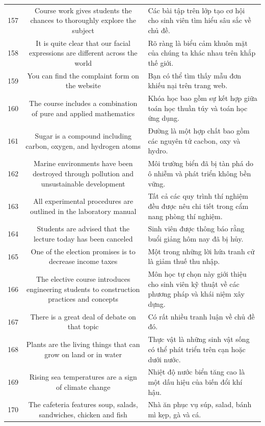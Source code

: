 \documentclass[11pt,a4paper]{article}
\begin{document}
\begin{longtable}{N S M}
157 & Course work gives students the chances to thoroughly explore the subject & Các bài tập trên lớp tạo cơ hội cho sinh viên tìm hiểu sâu sắc về chủ đề. \\
158 & It is quite clear that our facial expressions are different across the world & Rõ ràng là biểu cảm khuôn mặt của chúng ta khác nhau trên khắp thế giới. \\
159 & You can find the complaint form on the website & Bạn có thể tìm thấy mẫu đơn khiếu nại trên trang web. \\
160 & The course includes a combination of pure and applied mathematics & Khóa học bao gồm sự kết hợp giữa toán học thuần túy và toán học ứng dụng. \\
161 & Sugar is a compound including carbon, oxygen, and hydrogen atoms & Đường là một hợp chất bao gồm các nguyên tử cacbon, oxy và hydro. \\
162 & Marine environments have been destroyed through pollution and unsustainable development & Môi trường biển đã bị tàn phá do ô nhiễm và phát triển không bền vững. \\
163 & All experimental procedures are outlined in the laboratory manual & Tất cả các quy trình thí nghiệm đều được nêu chi tiết trong cẩm nang phòng thí nghiệm. \\
164 & Students are advised that the lecture today has been canceled & Sinh viên được thông báo rằng buổi giảng hôm nay đã bị hủy. \\
165 & One of the election promises is to decrease income taxes & Một trong những lời hứa tranh cử là giảm thuế thu nhập. \\
166 & The elective course introduces engineering students to construction practices and concepts & Môn học tự chọn này giới thiệu cho sinh viên kỹ thuật về các phương pháp và khái niệm xây dựng. \\
167 & There is a great deal of debate on that topic & Có rất nhiều tranh luận về chủ đề đó. \\
168 & Plants are the living things that can grow on land or in water & Thực vật là những sinh vật sống có thể phát triển trên cạn hoặc dưới nước. \\
169 & Rising sea temperatures are a sign of climate change & Nhiệt độ nước biển tăng cao là một dấu hiệu của biến đổi khí hậu. \\
170 & The cafeteria features soup, salads, sandwiches, chicken and fish & Nhà ăn phục vụ súp, salad, bánh mì kẹp, gà và cá. \\

\end{longtable}
\end{document}
